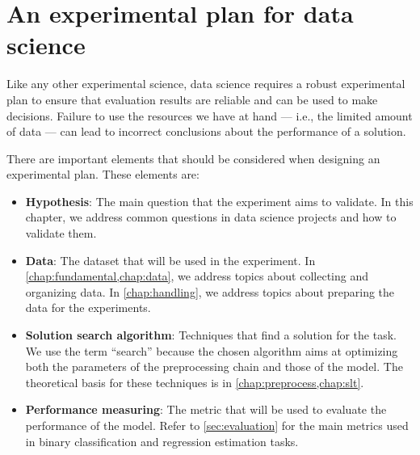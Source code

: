 

\section{An experimental plan for data science}

Like any other experimental science, data science requires a robust experimental
plan to ensure that evaluation results are reliable and can be used to make decisions.
Failure to use the resources we have at hand --- i.e., the limited amount of data ---
can lead to incorrect conclusions about the performance of a solution.

There are important elements that should be considered when designing an experimental
plan.  These elements are:
\begin{itemize}
  \item \textbf{Hypothesis}: The main question that the experiment aims to validate.
    In this chapter, we address common questions in data science projects and how to
    validate them.
  \item \textbf{Data}: The dataset that will be used in the experiment.  In
    \cref{chap:fundamental,chap:data}, we address topics about collecting and organizing data.
    In \cref{chap:handling}, we address topics about preparing the data for the
    experiments.
  \item \textbf{Solution search algorithm}: Techniques that find a solution for the task.
    We use the term ``search'' because the chosen algorithm aims at optimizing both the
    parameters of the preprocessing chain and those of the model. The theoretical
    basis for these techniques is in \cref{chap:preprocess,chap:slt}.
  \item \textbf{Performance measuring}: The metric that will be used to evaluate the
    performance of the model.  Refer to \cref{sec:evaluation} for the main metrics used in
    binary classification and regression estimation tasks.
\end{itemize}

